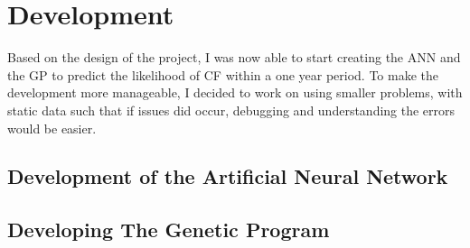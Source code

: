 \documentclass[11pt]{article}
\begin{document}
\section{Development}
Based on the design of the project, I was now able to start creating the ANN and the GP to predict the likelihood of CF within a one year period. To make the development more manageable, I decided to work on using smaller problems, with static data such that if issues did occur, debugging and understanding the errors would be easier. \\
\subsection{Development of the Artificial Neural Network}
\subsection{Developing The Genetic Program}
\end{document}
